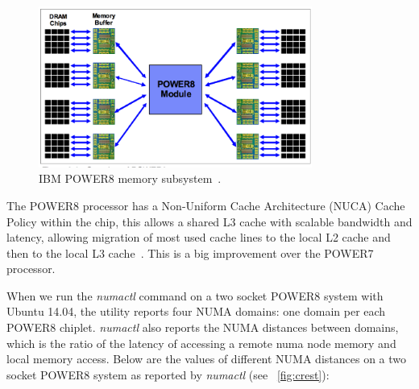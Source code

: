 \begin{figure}[h!]
  \centering
  \includegraphics[height=0.4\textwidth, width=0.8\textwidth]{./Images/P8_memory.pdf}
       \caption{IBM POWER8 memory subsystem~\cite{IBM_P8}.}
       \label{fig:p8_2}
\end{figure}
The POWER8 processor has a Non-Uniform Cache Architecture (NUCA) Cache Policy within the chip, this allows a shared L3 cache with scalable bandwidth and latency, allowing migration of most used cache lines to the local L2 cache and then to the local L3 cache~\cite{IBM_P8}. This is a big improvement over the POWER7 processor.  

When we run the \textit{numactl} command on a two socket POWER8 system with Ubuntu 14.04, the utility reports four NUMA domains: one domain per each POWER8 chiplet. \textit{numactl}  also reports the NUMA distances between domains, which is the ratio of the latency of accessing  a remote numa node memory and local memory access. Below are the values of different NUMA distances on a two socket POWER8 system as reported by \textit{numactl} (see ~\ref{fig:crest}): 

